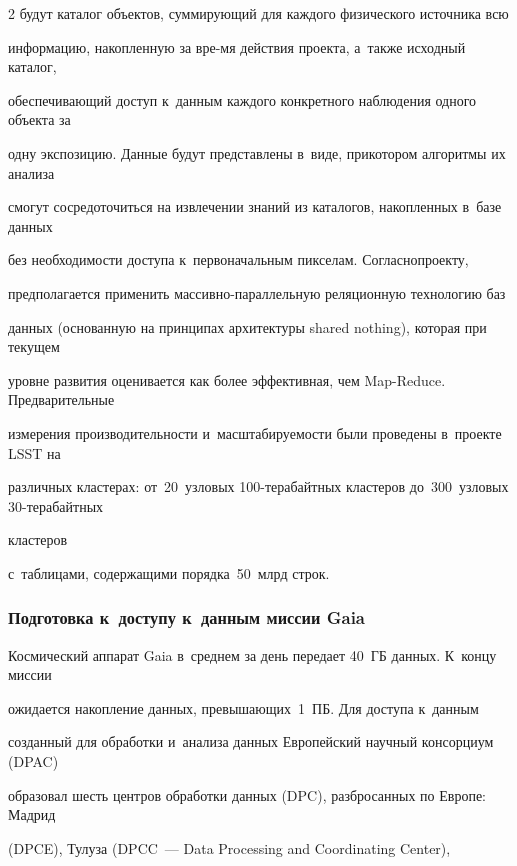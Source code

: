 \begin{multicols}{2}
будут каталог объектов, суммирующий для каждого физического источника всю 


информацию, накопленную за вре-\linebreak мя действия проекта, а~также исходный каталог, 


обеспечивающий доступ к~данным каждого конкретного наблюдения одного объекта за 


одну экспозицию. Данные будут представлены в~виде, при\linebreak котором алгоритмы их анализа 


смогут сосредоточиться на извлечении знаний из каталогов, накопленных в~базе данных 


без необходимости до\-ступа к~первоначальным пикселам. Согласно\linebreak проекту, 


предполагается применить мас\-сив\-но-па\-рал\-лель\-ную реляционную технологию баз 


данных (основанную на принципах архитектуры shared nothing), которая при текущем 


уровне развития оценивается как более эффективная, чем Map-Reduce. Предварительные 


измерения производительности и~масштабируемости были проведены в~проекте LSST на 


различных кластерах: от~20~узловых 100-те\-ра\-байт\-ных кластеров до~300~узловых 30-те\-ра\-байт\-ных


кластеров 


с~таблицами, содержащими порядка~50~млрд строк.





\subsubsection{Подготовка к~доступу к~данным миссии Gaia}





  Космический аппарат Gaia в~среднем за день передает 40~ГБ данных. К~концу миссии 


ожидается накопление данных, превышающих~1~ПБ. Для доступа к~данным 


созданный для обработки и~анализа данных Европейский научный консорциум (DPAC) 


образовал шесть центров обработки данных (DPC), разбросанных по Европе: Мадрид 


(DPCE), Тулуза (DPCC~--- Data Processing and Coordinating Center), 



\end{multicols}
